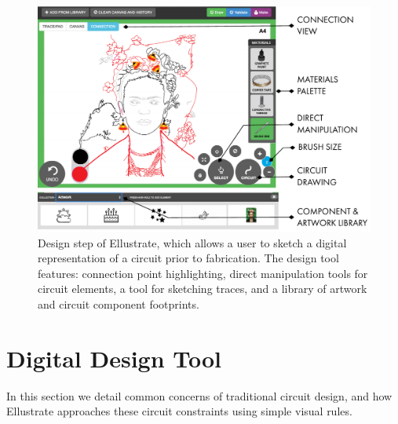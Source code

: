 \documentclass{sigchi}
\begin{document}
    \begin{figure}[t]
    \centering
    \includegraphics[width=1.0\columnwidth]{figures/designtool.pdf}
    \caption{Design step of Ellustrate, which allows a user to sketch a digital representation of a circuit prior to fabrication. The design tool features: connection point highlighting, direct manipulation tools for circuit elements, a tool for sketching traces, and a library of artwork and circuit component footprints.}
    \label{fig:design_tool}
    \vspace{-16pt}
    \end{figure}
    
\section{Digital Design Tool}
    In this section we detail common concerns of traditional circuit design, and how Ellustrate approaches these circuit constraints using simple visual rules.
\end{document}
